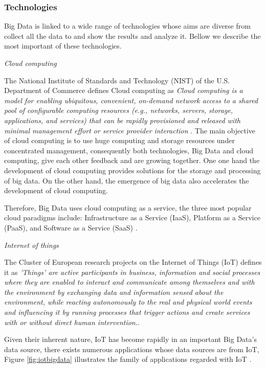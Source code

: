 \subsubsection{Technologies}

Big Data is linked to a wide range of technologies whose aims are diverse from collect all the data to and show the results and analyze it. Bellow we describe the most important of these technologies.

\emph{Cloud computing}%

The National Institute of Standards and Technology (NIST) of the U.S. Department of Commerce defines Cloud computing as \textit{Cloud computing is a model for enabling ubiquitous, convenient, on-demand network access to a shared pool of configurable computing resources (e.g., networks, servers, storage, applications, and services) that can be rapidly provisioned and released with minimal management effort or service provider interaction} \cite{mell2011nist}.
The main objective of cloud computing is to use huge computing and storage resources under concentrated management, consequently both technologies, Big Data and cloud computing, give each other feedback and are growing together. One one hand the development of cloud computing provides  solutions for the storage and processing of big data. On the other hand, the emergence of big data also accelerates the development of cloud computing.

Therefore, Big Data uses cloud computing  as a service, the three most popular cloud paradigms include: Infrastructure as a Service (IaaS), Platform as a Service (PaaS), and Software as a Service (SaaS) \cite{agrawal2010big}.


\emph{Internet of things}%

The Cluster of European research projects on the Internet of Things (IoT) defines it as \textit{'Things' are active participants in business, information and social processes where they are enabled to interact and communicate among themselves and with the environment by exchanging data and information sensed about the environment, while reacting autonomously to the real and physical world events and influencing it by running processes that trigger actions and create services with or without direct human intervention.}\cite{sundmaeker2010vision}.

Given their inherent nature, IoT has become rapidly in an important Big Data's data source, there exists numerous applications whose data sources are from IoT, Figure \ref{fig:iotbigdata} illustrates the family of applications regarded with  IoT \cite{atzori2010internet}.


